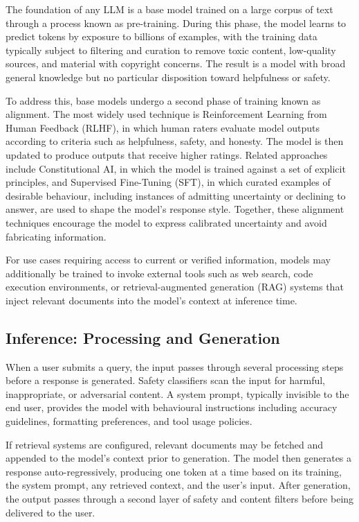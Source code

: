 The foundation of any LLM is a base model trained on a large corpus of text through a process known as pre-training. During this phase, the model learns to predict tokens by exposure to billions of examples, with the training data typically subject to filtering and curation to remove toxic content, low-quality sources, and material with copyright concerns. The result is a model with broad general knowledge but no particular disposition toward helpfulness or safety.

To address this, base models undergo a second phase of training known as alignment. The most widely used technique is Reinforcement Learning from Human Feedback (RLHF), in which human raters evaluate model outputs according to criteria such as helpfulness, safety, and honesty. The model is then updated to produce outputs that receive higher ratings. Related approaches include Constitutional AI, in which the model is trained against a set of explicit principles, and Supervised Fine-Tuning (SFT), in which curated examples of desirable behaviour, including instances of admitting uncertainty or declining to answer, are used to shape the model's response style. Together, these alignment techniques encourage the model to express calibrated uncertainty and avoid fabricating information.

For use cases requiring access to current or verified information, models may additionally be trained to invoke external tools such as web search, code execution environments, or retrieval-augmented generation (RAG) systems that inject relevant documents into the model's context at inference time.

\subsection{Inference: Processing and Generation}

When a user submits a query, the input passes through several processing steps before a response is generated. Safety classifiers scan the input for harmful, inappropriate, or adversarial content. A system prompt, typically invisible to the end user, provides the model with behavioural instructions including accuracy guidelines, formatting preferences, and tool usage policies.

If retrieval systems are configured, relevant documents may be fetched and appended to the model's context prior to generation. The model then generates a response auto-regressively, producing one token at a time based on its training, the system prompt, any retrieved context, and the user's input. After generation, the output passes through a second layer of safety and content filters before being delivered to the user.

